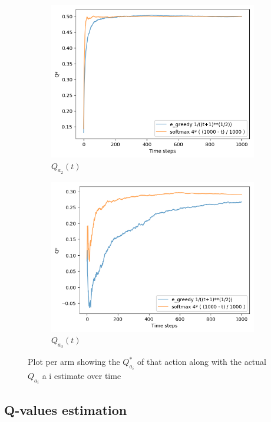 \documentclass[letterpaper]{article}
\begin{document}
\begin{figure}[H]
\begin{subfigure}{.5\textwidth}
    \includegraphics[width=1\linewidth]{images/assign3/ex3/qta_2}
    \caption{$Q_{a_{2}}(t)$}
    \label{fig:qta_2_ex3}
  \end{subfigure}
  \begin{subfigure}{.5\textwidth}
    \centering
    \includegraphics[width=1\linewidth]{images/assign3/ex3/qta_3}
    \caption{$Q_{a_{3}}(t)$}
    \label{fig:qta_3_ex3}
  \end{subfigure}

    \caption{Plot per arm showing
    the $Q^{*}_{a_{i}}$
    of that action along with the actual $Q_{a_{i}}$ a i estimate over time}
    \label{fig:qtas_ex3}
\end{figure}

\subsection{Q-values estimation}
\end{document}
